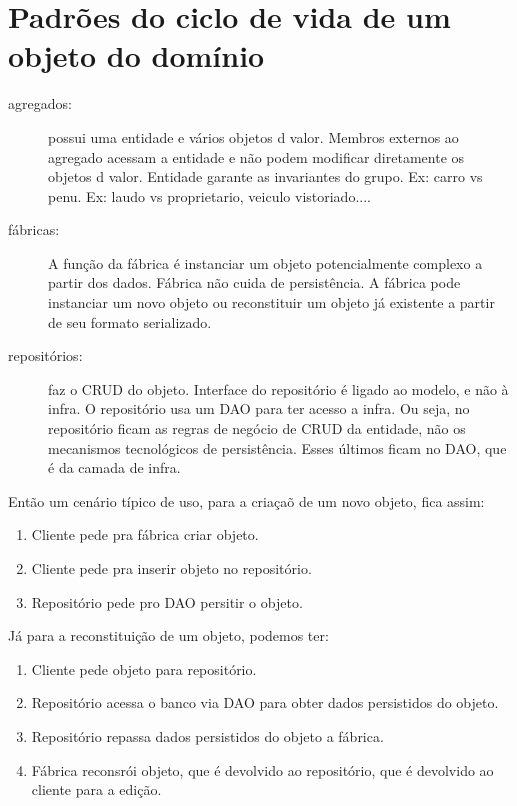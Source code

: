 \documentclass[a4paper, 12pt]{article}
\begin{document}
\section{Padrões do ciclo de vida de um objeto do domínio}

\begin{description}
\item [agregados:] possui uma entidade e vários objetos d valor. Membros externos ao agregado acessam a entidade e não podem modificar diretamente os objetos d valor. Entidade garante as invariantes do grupo. Ex: carro vs penu. Ex: laudo vs {proprietario, veiculo vistoriado...}.
\item [fábricas:] A função da fábrica é instanciar um objeto potencialmente complexo a partir dos dados. Fábrica não cuida de persistência. A fábrica pode instanciar um novo objeto ou reconstituir um objeto já existente a partir de seu formato serializado.
\item [repositórios:] faz o CRUD do objeto. Interface do repositório é ligado ao modelo, e não à infra. O repositório usa um DAO para ter acesso a infra. Ou seja, no repositório ficam as regras de negócio de CRUD da entidade, não os mecanismos tecnológicos de persistência. Esses últimos ficam no DAO, que é da camada de infra.
\end{description}

Então um cenário típico de uso, para a criaçaõ de um novo objeto, fica assim:
\begin{enumerate}
\item Cliente pede pra fábrica criar objeto.
\item Cliente pede pra inserir objeto no repositório.
\item Repositório pede pro DAO persitir o objeto.
\end{enumerate}

Já para a reconstituição de um objeto, podemos ter:

\begin{enumerate}
\item Cliente pede objeto para repositório.
\item Repositório acessa o banco via DAO para obter dados persistidos do objeto.
\item Repositório repassa dados persistidos do objeto a fábrica.
\item Fábrica reconsrói objeto, que é devolvido ao repositório, que é devolvido ao cliente para a edição.
\end{enumerate}
\end{document}
